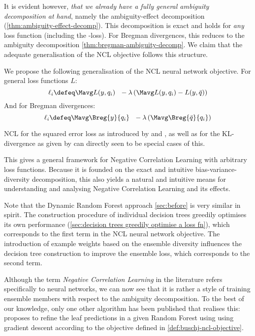 \documentclass[../main.tex]{subfiles}
\begin{document}
It is evident however, \textit{that we already have a fully general ambiguity decomposition at hand}, namely the ambiguity-effect decomposition (\ref{thm:ambiguity-effect-decomp}). 
This decomposition is exact and holds for \textit{any} loss function (including the \zeroone-loss). 
For Bregman divergences, this reduces to the ambiguity decomposition \ref{thm:bregman-ambiguity-decomp}.
%
We claim that the adequate generalisation of the NCL objective follows this structure.
\begin{definition} We propose the following generalisation of the NCL neural network objective. For general loss functions $L$:
$$
\ell_{i} \defeq \Mavg L(y, q_{i}) ~ ~ - \lambda \left( 
\Mavg L(y, q_{i}) - L(y, \bar{q})
\right)
$$
And for Bregman divergences:
$$
\ell_{i} \defeq \Mavg \Breg{y}{q_{i}} ~ ~ - \lambda\left( \Mavg \Breg{\bar{q}}{q_{i}} \right)
$$
\end{definition}
NCL for the squared error loss as introduced by \cite{LiuYao} and \cite{brown2005}, as well as for the KL-divergence as given by \cite{webb} can directly seen to be special cases of this.


This gives a general framework for Negative Correlation Learning with arbitrary loss functions. Because it is founded on the exact and intuitive bias-variance-diversity decomposition, this also yields a natural and intuitive means for understanding and analysing Negative Correlation Learning and its effects.

Note that the Dynamic Random Forest approach \ref{sec:before} is very similar in spirit. The construction procedure of individual decision trees greedily optimises its own performance (\ref{sec:decision trees greedily optimise a loss fn}), which corresponds to the first term in the NCL neural network objective. The introduction of example weights based on the ensemble diversity influences the decision tree construction to improve the ensemble loss, which corresponds to the second term.

Although the term \textit{Negative Correlation Learning} in the literature refers specifically to neural networks, we can now see that it is rather a style of training ensemble members with respect to the ambiguity decomposition.
To the best of our knowledge, only one other algorithm has been published that realises this: \cite{negative-correlation-forests} proposes to refine the leaf predictions in a given Random Forest using using gradient descent according to the objective defined in \ref{def:buschj-ncl-objective}.
\end{document}
